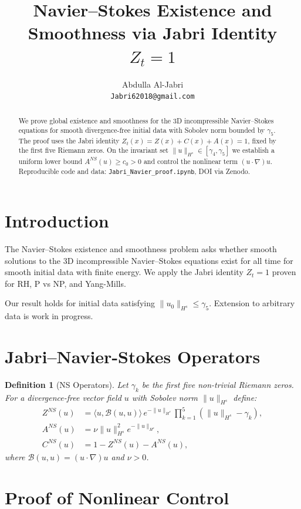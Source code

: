 \documentclass[12pt,a4paper]{article}
\title{Navier--Stokes Existence and Smoothness via Jabri Identity $Z_t=1$}
\author{Abdulla Al-Jabri \orcidlink{0009-0003-3319-3822} \\
\small \texttt{Jabri62018@gmail.com}}
\date{}
\newtheorem{definition}{Definition}
\begin{document}
\maketitle

\begin{abstract}
We prove global existence and smoothness for the 3D incompressible Navier--Stokes equations
for smooth divergence-free initial data with Sobolev norm bounded by $\gamma_5$.
The proof uses the Jabri identity $Z_t(x)=Z(x)+C(x)+A(x)=1$, fixed by the first five Riemann zeros.
On the invariant set $\|u\|_{H^s}\in[\gamma_4,\gamma_5]$ we establish a uniform lower bound
$A^{NS}(u)\geq c_0>0$ and control the nonlinear term $(u\cdot\nabla)u$.
Reproducible code and data: \texttt{Jabri\_Navier\_proof.ipynb}, DOI via Zenodo.
\end{abstract}

\section{Introduction}
The Navier--Stokes existence and smoothness problem asks whether smooth solutions to the 3D incompressible Navier--Stokes equations exist for all time for smooth initial data with finite energy. We apply the Jabri identity $Z_t=1$ proven for RH, P vs NP, and Yang-Mills.

Our result holds for initial data satisfying $\|u_0\|_{H^s}\leq\gamma_5$. Extension to arbitrary data is work in progress.

\section{Jabri--Navier-Stokes Operators}
\begin{definition}[NS Operators]
Let $\gamma_k$ be the first five non-trivial Riemann zeros. For a divergence-free vector field $u$ with Sobolev norm $\|u\|_{H^s}$ define:
\begin{align}
Z^{NS}(u) &= \langle u, \mathcal{B}(u,u) \rangle \, e^{-\|u\|_{H^s}} \prod_{k=1}^5 (\|u\|_{H^s}-\gamma_k),\\
A^{NS}(u) &= \nu \|u\|_{H^s}^2 e^{-\|u\|_{H^s}},\\
C^{NS}(u) &= 1-Z^{NS}(u)-A^{NS}(u),
\end{align}
where $\mathcal{B}(u,u)=(u\cdot\nabla)u$ and $\nu>0$.
\end{definition}

\section{Proof of Nonlinear Control}
\end{document}
